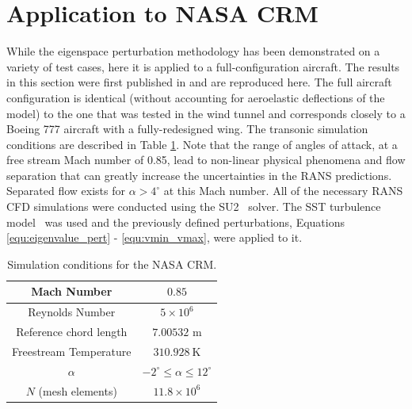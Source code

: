 \section{Application to NASA CRM} \label{sec:crm_rans_uq}
While the eigenspace perturbation methodology has been demonstrated on a variety of test cases, here it is applied to a full-configuration aircraft.
The results in this section were first published in \cite{mukhopadhaya2020multi}  and are reproduced here.  
The full aircraft configuration is identical (without accounting for aeroelastic deflections of the model) to the one that was tested in the wind tunnel and corresponds closely to a Boeing 777 aircraft with a fully-redesigned wing. The transonic simulation conditions are described in Table \ref{NASA_CRM_test_cond}. Note that the range of angles of attack, at a free stream Mach number of 0.85, lead to non-linear physical phenomena and flow separation that can greatly increase the uncertainties in the RANS predictions. Separated flow exists for $\alpha > 4^\circ$ at this Mach number. All of the necessary RANS CFD simulations were conducted using the SU2~\cite{su2_aiaajournal} solver. The SST turbulence model~\cite{menter1994two,menter2003ten} was used and the previously defined perturbations, Equations \eqref{equ:eigenvalue_pert} - \eqref{equ:vmin_vmax}, were applied to it. 

\begin{table}
\centering
    \renewcommand{\arraystretch}{1.2}
    \captionsetup{justification=centering}
    \caption{Simulation conditions for the NASA CRM.} 
    \begin{tabular}{|c|c|}
        \hline
        Mach Number & $0.85$ \\ \hline
        Reynolds Number & $5\times10^6$ \\ \hline
        Reference chord length & $7.00532$ m \\ \hline
        Freestream Temperature & $310.928~\text{K}$ \\ \hline
        $\alpha$ & $-2^\circ \leq \alpha \leq 12^\circ$ \\ \hline 
        $N$ (mesh elements) &  $11.8\times10^6$ \\ \hline
    \end{tabular}
    \label{NASA_CRM_test_cond}
\end{table}

